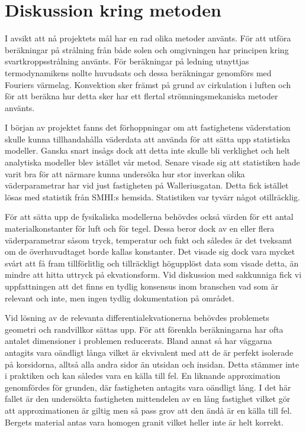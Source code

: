 \section{Diskussion kring metoden}\label{sec:discmethod}

I avsikt att nå projektets mål har en rad olika metoder använts. För att utföra beräkningar på strålning från både solen och omgivningen har principen kring svartkroppsstrålning använts. För beräkningar på ledning utnyttjas termodynamikens nollte huvudsats och dessa beräkningar genomförs med Fouriers värmelag. Konvektion sker främst på grund av cirkulation i luften och för att beräkna hur detta sker har ett flertal strömningsmekaniska metoder använts.

I början av projektet fanns det förhoppningar om att fastighetens väderstation skulle kunna tillhandahålla väderdata att använda för att sätta upp statistiska modeller. 
Ganska snart insågs dock att detta inte skulle bli verklighet och helt analytiska modeller blev istället vår metod. Senare visade sig att statistiken hade varit bra för att närmare kunna undersöka hur stor inverkan olika väderparametrar har vid just fastigheten på Walleriusgatan. 
Detta fick istället lösas med statistik från SMHI:s hemsida. Statistiken var tyvärr något otillräcklig.

För att sätta upp de fysikaliska modellerna behövdes också värden för ett antal materialkonstanter för luft och för tegel. 
Dessa beror dock av en eller flera väderparametrar såsom tryck, temperatur och fukt och således är det tveksamt om de överhuvudtaget borde kallas konstanter. 
Det visade sig dock vara mycket svårt att få fram tillförlitlig och tillräckligt högupplöst data som visade detta, än mindre att hitta uttryck på ekvationsform.
Vid diskussion med sakkunniga fick vi uppfattningen att det finns en tydlig konsensus inom branschen vad som är relevant och inte, men ingen tydlig dokumentation på området.

Vid lösning av de relevanta differentialekvationerna behövdes problemets geometri och randvillkor sättas upp. För
att förenkla beräkningarna har ofta antalet dimensioner i problemen reducerats. Bland annat så har väggarna antagits vara oändligt
långa vilket är ekvivalent med att de är perfekt isolerade på korsidorna, alltså alla andra sidor än utsidan och insidan. Detta stämmer inte
i praktiken och kan således vara en källa till fel. En liknande approximation genomfördes för grunden, där fastigheten
antagits vara oändligt lång. I det här fallet är den undersökta fastigheten mittendelen av en lång fastighet vilket
gör att approximationen är giltig men så pass grov att den ändå är en källa till fel. Bergets material antas vara homogen granit vilket
heller inte är helt korrekt. 

